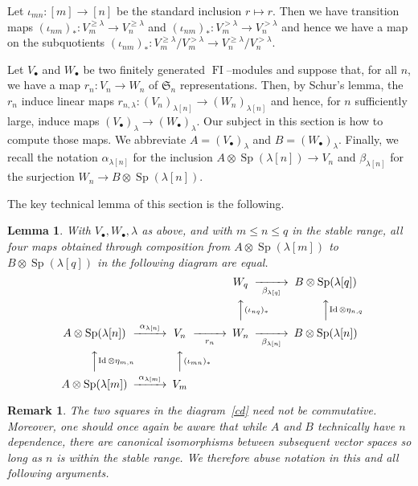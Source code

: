 \documentclass[10pt]{amsart}
\DeclareMathOperator{\FI}{FI}
\DeclareMathOperator{\Sp}{Sp}
\DeclareMathOperator{\Id}{Id}
\newcommand{\Sn}{\mathfrak{S}}
\newcommand{\dt}{\bullet}
\newtheorem{lemma}[theorem]{Lemma}
\newtheorem{remark}[theorem]{Remark}
\theoremstyle{definition}
\begin{document}
Let $\iota_{mn}: [m] \to [n]$ be the standard inclusion $r \mapsto r$. Then we have transition maps $(\iota_{nm})_{\ast}: V^{\geq \lambda}_m \to V^{\geq \lambda}_n$ and $(\iota_{nm})_{\ast}: V^{> \lambda}_m \to V^{> \lambda}_n$ and hence we have a map on the subquotients $(\iota_{nm})_{\ast}: V^{\geq \lambda}_m/V^{>\lambda}_m \to V^{\geq \lambda}_n/V^{>\lambda}_n$.

Let $V_{\bullet}$ and $W_{\bullet}$ be two finitely generated $\FI$--modules and suppose that, for all $n$, we have a map $r_n : V_n \to W_n$ of $\Sn_n$ representations. Then, by Schur's lemma, the $r_n$ induce linear maps $r_{n,\lambda} :(V_n)_{\lambda[n]} \to (W_n)_{\lambda[n]}$ and hence, for $n$ sufficiently large, induce maps $(V_\dt)_{\lambda} \to (W_\dt)_{\lambda}$. Our subject in this section is how to compute those maps. We abbreviate $A = (V_\dt)_{\lambda}$ and $B = (W_\dt)_{\lambda}$. Finally, we recall the notation $\alpha_{\lambda[n]}$ for the inclusion $A \otimes \Sp(\lambda[n]) \to V_n$ and $\beta_{\lambda[n]}$ for the surjection $W_n \to B \otimes \Sp(\lambda[n])$.


The key technical lemma of this section is the following.

\begin{lemma}\label{comdi}
With $V_\bullet,W_\bullet,\lambda$ as above, and with $m \leq n \leq q$ in the stable range, all four maps obtained through composition from $A \otimes \Sp(\lambda[m])$ to $B \otimes \Sp(\lambda[q])$ in the following diagram are equal.
\begin{equation}
\begin{CD}
@. @. W_q @>>\beta_{\lambda[q]}> B \otimes \Sp(\lambda[q])\\
@. @. @AA(\iota_{nq})_\ast A @AA \Id \otimes \eta_{n,q}A\\
A \otimes \Sp(\lambda[n]) @>\alpha_{\lambda[n]}>> V_n @>>r_n> W_n @>>\beta_{\lambda[n]}> B \otimes\Sp(\lambda[n])\\
@AA \Id \otimes \eta_{m,n}A @AA(\iota_{mn})_\ast A\\
A \otimes \Sp(\lambda[m]) @>\alpha_{\lambda[m]}>> V_m @. @.
\end{CD}\label{cd}
\end{equation}
\end{lemma}

\begin{remark}
The two squares in the diagram~\eqref{cd} need \emph{not} be commutative. Moreover, one should once again be aware that while $A$ and $B$ technically have $n$ dependence, there are canonical isomorphisms between subsequent vector spaces so long as $n$ is within the stable range. We therefore abuse notation in this and all following arguments.
\end{remark}
\end{document}
